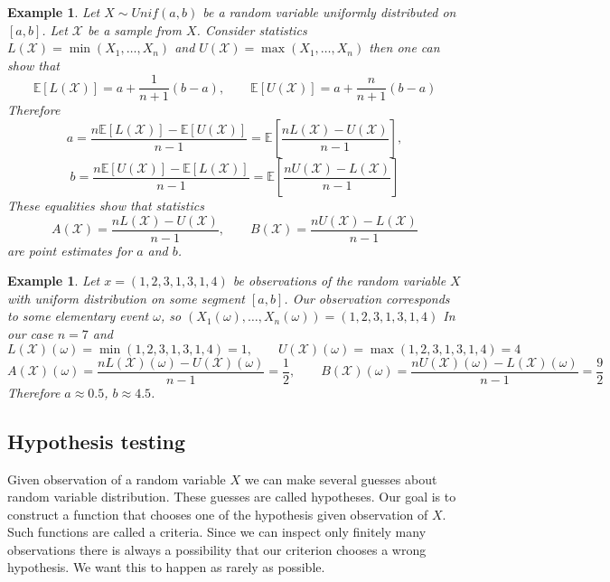 \documentclass[12pt]{article}
\newtheorem{example}[theorem]{Example}
\begin{document}
\begin{example} Let $X\sim Unif(a, b)$ be a random variable uniformly
    distributed on $[a, b]$. Let $\mathscr{X}$ be a sample from $X$. Consider
    statistics $L(\mathscr{X})=\min(X_1,\ldots,X_n)$ and
    $U(\mathscr{X})=\max(X_1,\ldots,X_n)$ then one can show that
    $$
        \mathbb{E}[L(\mathscr{X})]=a+\frac{1}{n+1}(b-a),
        \quad\quad
        \mathbb{E}[U(\mathscr{X})]=a+\frac{n}{n+1}(b-a)
    $$
    Therefore
    $$
        a=\frac{n\mathbb{E}[L(\mathscr{X})]-\mathbb{E}[U(\mathscr{X})]}{n-1}
        =\mathbb{E}\left[\frac{n L(\mathscr{X})-U(\mathscr{X})}{n-1}\right],
    $$
    $$
        b=\frac{n\mathbb{E}[U(\mathscr{X})]-\mathbb{E}[L(\mathscr{X})]}{n-1}
        =\mathbb{E}\left[\frac{n U(\mathscr{X})-L(\mathscr{X})}{n-1}\right]
    $$
    These equalities show that statistics
    $$
        A(\mathscr{X})=\frac{n L(\mathscr{X})-U(\mathscr{X})}{n-1},
        \quad\quad
        B(\mathscr{X})=\frac{n U(\mathscr{X})-L(\mathscr{X})}{n-1}
    $$
    are point estimates for $a$ and $b$.
\end{example}

\begin{example} Let $x=(1,2,3,1,3,1,4)$ be observations of the random variable
    $X$ with uniform distribution on some segment $[a,b]$. Our observation
    corresponds to some elementary event $\omega$, so
    $(X_1(\omega),\ldots,X_n(\omega))=(1,2,3,1,3,1,4)$ In our case $n=7$ and
    $$
        L(\mathscr{X})(\omega)=\min(1,2,3,1,3,1,4)=1,
        \quad\quad
        U(\mathscr{X})(\omega)=\max(1,2,3,1,3,1,4)=4
    $$
    $$
        A(\mathscr{X})(\omega)=
        \frac{n L(\mathscr{X})(\omega)-U(\mathscr{X})(\omega)}{n-1}=\frac{1}{2},
        \quad\quad
        B(\mathscr{X})(\omega)=
        \frac{n U(\mathscr{X})(\omega)-L(\mathscr{X})(\omega)}{n-1}=\frac{9}{2}
    $$
    Therefore $a\approx 0.5$, $b\approx 4.5$.
\end{example}

\subsection{Hypothesis testing}

Given observation of a random variable $X$ we can make several guesses about
random variable distribution. These guesses are called hypotheses. Our goal is
to construct a function that chooses one of the hypothesis given observation of
$X$. Such functions are called a criteria. Since we can inspect only finitely
many observations there is always a possibility that our criterion chooses a
wrong hypothesis. We want this to happen as rarely as possible.
\end{document}
